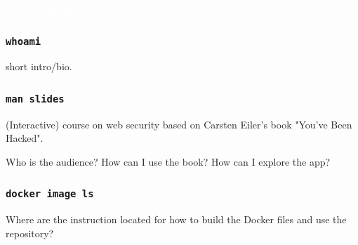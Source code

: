 \documentclass[aspectratio=169]{beamer}
\begin{document}
{
\begin{frame}
\huge{\textcolor{white}{\textbf{0x0: Preliminaries}}}
\end{frame}
}

\begin{frame}
    \frametitle{\texttt{whoami}}
    short intro/bio.
\end{frame}

\begin{frame}
    \frametitle{\texttt{man slides}}

    (Interactive) course on web security based on Carsten Eiler's book "You've Been Hacked".
    
    Who is the audience? How can I use the book? How can I explore the app?
\end{frame}

\begin{frame}
    \frametitle{\texttt{docker image ls}}
    Where are the instruction located for how to build the Docker files and use the repository?
\end{frame}
\end{document}
